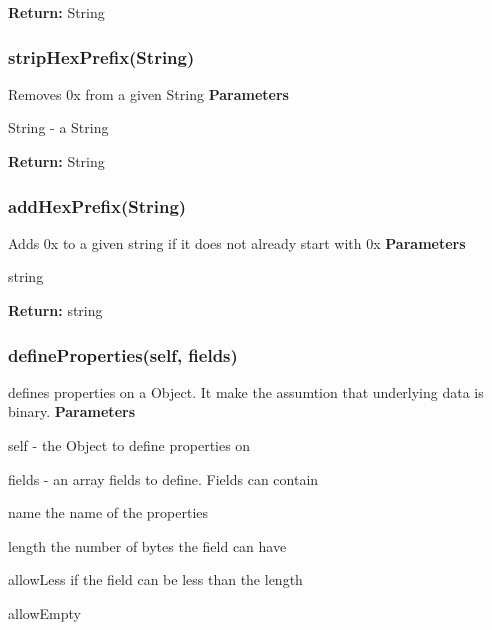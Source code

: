 {\bfseries Return\+:} {\ttfamily String}

\subsubsection*{{\ttfamily strip\+Hex\+Prefix(\+String)}}

Removes {\ttfamily 0x} from a given String {\bfseries Parameters}
\begin{DoxyItemize}
\item String -\/ a {\ttfamily String}
\end{DoxyItemize}

{\bfseries Return\+:} {\ttfamily String}

\subsubsection*{{\ttfamily add\+Hex\+Prefix(\+String)}}

Adds {\ttfamily 0x} to a given string if it does not already start with {\ttfamily 0x} {\bfseries Parameters}
\begin{DoxyItemize}
\item {\ttfamily string}
\end{DoxyItemize}

{\bfseries Return\+:} {\ttfamily string}

\subsubsection*{{\ttfamily define\+Properties(self, fields)}}

defines properties on a {\ttfamily Object}. It make the assumtion that underlying data is binary. {\bfseries Parameters}
\begin{DoxyItemize}
\item {\ttfamily self} -\/ the {\ttfamily Object} to define properties on
\item {\ttfamily fields} -\/ an array fields to define. Fields can contain
\begin{DoxyItemize}
\item {\ttfamily name} the name of the properties
\item {\ttfamily length} the number of bytes the field can have
\item {\ttfamily allow\+Less} if the field can be less than the {\ttfamily length}
\item {\ttfamily allow\+Empty}
\end{DoxyItemize}
\end{DoxyItemize}

